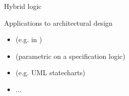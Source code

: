 \documentclass{beamer}
\begin{document}
\begin{slide}{Hybrid logic}\label{s:51b}
\small


\begin{block}{Applications to architectural design}
\begin{itemize}
\item {} (e.g. in \reo)
\item {} (parametric on a specification logic)
\item {} (e.g. UML statecharts)
\item ...
\end{itemize}
\end{block}
\begin{flushright}
\end{flushright}
\end{slide}
\end{document}
